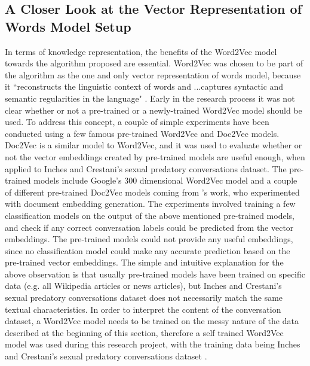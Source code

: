 \documentclass[11pt]{article}
\begin{document}
\subsection{A Closer Look at the Vector Representation of Words Model Setup}
In terms of knowledge representation, the benefits of the Word2Vec model towards the algorithm proposed are essential. Word2Vec was chosen to be part of the algorithm as the one and only vector representation of words model, because it ``reconstructs the linguistic context of words and ...captures syntactic and semantic regularities in the language" \cite{mikolov2013linguistic}. Early in the research process it was not clear whether or not a pre-trained or a newly-trained Word2Vec model should be used. To address this concept, a couple of simple experiments have been conducted using a few famous pre-trained Word2Vec and Doc2Vec \cite{le2014distributed} models. Doc2Vec is a similar model to Word2Vec, and it was used to evaluate whether or not the vector embeddings created by pre-trained models are useful enough, when applied to Inches and Crestani's sexual predatory conversations dataset. The pre-trained models include Google's 300 dimensional Word2Vec model \cite{MikolovChenCorradoDean2013a} and a couple of different pre-trained Doc2Vec models coming from \cite{lau2016empirical}'s work, who experimented with document embedding generation. The experiments involved training a few classification models on the output of the above mentioned pre-trained models, and check if any correct conversation labels could be predicted from the vector embeddings. The pre-trained models could not provide any useful embeddings, since no classification model could make any accurate prediction based on the pre-trained vector embeddings. The simple and intuitive explanation for the above observation is that usually pre-trained models have been trained on specific data (e.g. all Wikipedia articles or news articles), but Inches and Crestani's sexual predatory conversations dataset does not necessarily match the same textual characteristics. In order to interpret the content of the conversation dataset, a Word2Vec model needs to be trained on the messy nature of the data described at the beginning of this section, therefore a self trained Word2Vec model was used during this research project, with the training data being Inches and Crestani's sexual predatory conversations dataset \cite{inches2012overview}.
\end{document}
